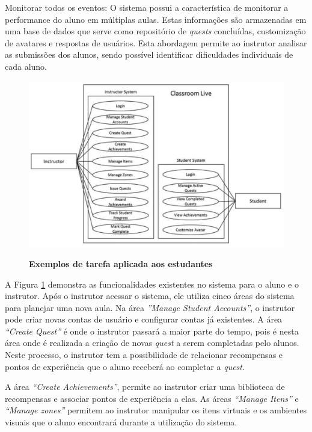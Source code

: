 \documentclass[
	12pt,				%
	oneside,			%
	a4paper,			%
	english,			%
	french,				%
	spanish,			%
	brazil,				%
	]{abntex2}
\begin{document}
Monitorar todos os eventos: O sistema possui a característica de monitorar a performance do aluno em múltiplas aulas. Estas informações são armazenadas em uma base de dados que serve como repositório de \textit{quests} concluídas, customização de avatares e respostas de usuários. Esta abordagem permite ao instrutor analisar as submissões dos alunos, sendo possível identificar dificuldades individuais de cada aluno. 

\begin{figure}[ht]
\centering
\caption{\textbf{Exemplos de tarefa aplicada aos estudantes}}
\includegraphics[width=1\textwidth]{imagens/classroom_diagrama.png}
\label{fig:classroom_diagrama}
\end{figure}

A Figura \ref{fig:classroom_diagrama} demonstra as funcionalidades existentes no sistema para o aluno e o instrutor. Após o instrutor acessar o sistema, ele utiliza cinco áreas do sistema para planejar uma nova aula. Na área \textit{”Manage Student Accounts”}, o instrutor pode criar novas contas de usuário e configurar contas já existentes. A área \textit{“Create Quest”} é onde o instrutor passará a maior parte do tempo, pois é nesta área onde é realizada a criação de novas \textit{quest} a serem completadas pelo alunos. Neste processo, o instrutor tem a possibilidade de relacionar recompensas e pontos de experiência que o aluno receberá ao completar a \textit{quest}. 

A área \textit{“Create Achievements”}, permite ao instrutor criar uma biblioteca de recompensas e associar pontos de experiência a elas. As áreas \textit{“Manage Itens”} e \textit{“Manage zones”} permitem ao instrutor manipular os itens virtuais e os ambientes visuais que o aluno encontrará durante a utilização do sistema.
\end{document}
